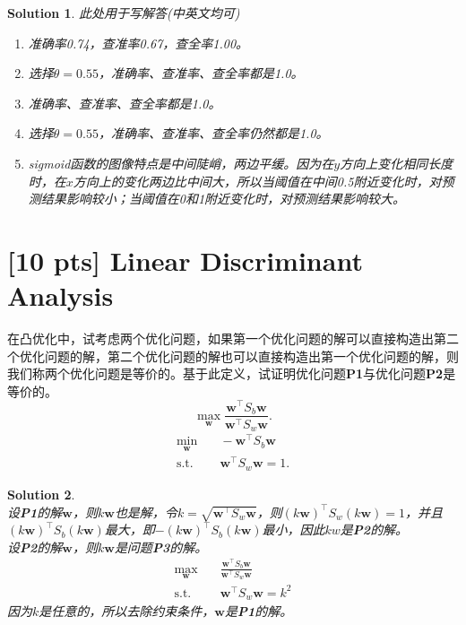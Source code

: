 \documentclass[a4paper,UTF8]{article}
\numberwithin{equation}{section}
\newtheorem*{solution}{Solution}
\begin{document}
\begin{solution}
	此处用于写解答(中英文均可)
	\begin{enumerate}[(1)]
		\item 
		准确率0.74，查准率0.67，查全率1.00。
		\item 
		选择$\theta=0.55$，准确率、查准率、查全率都是1.0。
		\item 
		准确率、查准率、查全率都是1.0。
		\item 
		选择$\theta=0.55$，准确率、查准率、查全率仍然都是1.0。
		\item 
		sigmoid函数的图像特点是中间陡峭，两边平缓。因为在$y$方向上变化相同长度时，在$x$方向上的变化两边比中间大，所以当阈值在中间0.5附近变化时，对预测结果影响较小；当阈值在0和1附近变化时，对预测结果影响较大。
	\end{enumerate}
\end{solution}

\section{[10 pts] Linear Discriminant Analysis}
在凸优化中，试考虑两个优化问题，如果第一个优化问题的解可以直接构造出第二个优化问题的解，第二个优化问题的解也可以直接构造出第一个优化问题的解，则我们称两个优化问题是等价的。基于此定义，试证明优化问题\textbf{P1}与优化问题\textbf{P2}是等价的。
\begin{equation}
	\label{P1}
	\max_{\mathbf{w}} \frac{\mathbf{w}^\top S_b \mathbf{w}}{\mathbf{w}^\top S_w \mathbf{w}} . 
\end{equation}
\begin{equation}
	\label{P2}
	\begin{aligned}
		\min_{\mathbf{w}} & \quad -\mathbf{w}^\top S_b \mathbf{w} \\ 
		\text{s.t.} & \quad \mathbf{w}^\top S_w \mathbf{w} = 1 . 
	\end{aligned}
\end{equation}

\begin{solution}
	~\\
	设\textbf{P1}的解$\mathbf{w}$，则$k\mathbf{w}$也是解，令$k=\sqrt{\mathbf{w}^\top S_w \mathbf{w}}$，则$(k\mathbf{w})^\top S_w (k\mathbf{w})=1$，并且$(k\mathbf{w})^\top S_b (k\mathbf{w})$最大，即$-(k\mathbf{w})^\top S_b (k\mathbf{w})$最小，因此$kw$是\textbf{P2}的解。\\
	设\textbf{P2}的解$\mathbf{w}$，则$k\mathbf{w}$是问题\textbf{P3}的解。
	\begin{equation*}
	\begin{aligned}
	\max_{\mathbf{w}} & \quad \frac{\mathbf{w}^\top S_b \mathbf{w}}{\mathbf{w}^\top S_w \mathbf{w}} \\ 
	\text{s.t.} & \quad \mathbf{w}^\top S_w \mathbf{w} = k^2
	\end{aligned}
	\end{equation*}
	因为$k$是任意的，所以去除约束条件，$\mathbf{w}$是\textbf{P1}的解。
\end{solution}
\end{document}
